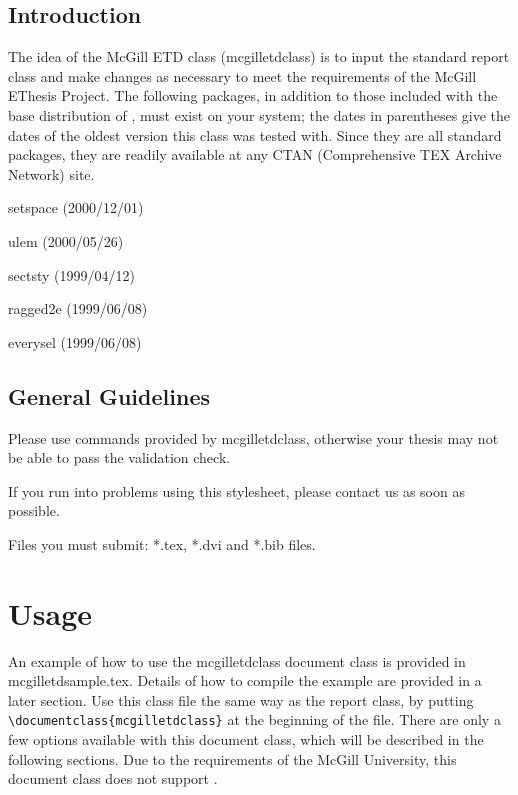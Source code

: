 \documentclass[12pt,Bold,letterpaper,TexShade]{mcgilletdclass}
\begin{document}
\section{Introduction}
The idea of the McGill ETD class (mcgilletdclass) is to input the standard \LaTeXe report
class and make changes as necessary to meet the requirements of the McGill EThesis Project. 
The following packages, in addition to those included
with the base distribution of \LaTeXe, must exist on your system;
the dates in parentheses give the dates of the oldest version this class
was tested with. Since they are all standard packages, they are readily
available at any CTAN (Comprehensive TEX Archive Network)
site. 
\begin{BulletList}
	\item{setspace (2000/12/01)}
	\item{ulem (2000/05/26)}
	\item{sectsty (1999/04/12)}
	\item{ragged2e (1999/06/08)}
	\item{everysel (1999/06/08)}
\end{BulletList}
\section{General Guidelines}
\begin{BulletList}
	\item{Please use commands provided by mcgilletdclass, otherwise your thesis may not be able to pass the validation check.}
	\item{If you run into problems using this stylesheet, please contact us as soon as possible.}
	\item{Files you must submit: *.tex, *.dvi and *.bib files.}
\end{BulletList}


\chapter{Usage}
An example of how to use the mcgilletdclass document class is provided in 
mcgilletdsample.tex. Details of how to compile the example are 
provided in a later section.
Use this class file the same way as the report class, by putting
\verb=\documentclass{mcgilletdclass}= at the beginning of the \LaTeXe file.
There are only a few options available with this document class, which
will be described in the following sections. Due to the requirements of
the McGill University, this document class does not support .
\end{document}
